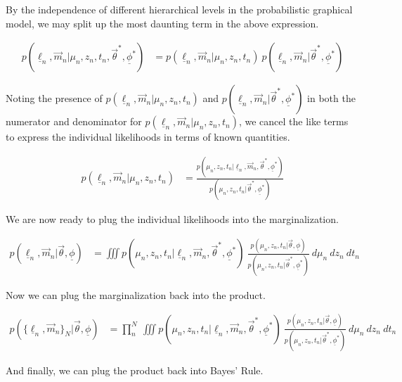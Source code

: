 \documentclass[12pt, onecolumn]{emulateapj}
\newcommand{\textul}{\underline}
\begin{document}
By the independence of different hierarchical levels in the probabilistic graphical model, we may split up the most daunting term in the above expression.

\begin{align}
p(\textul{\ell}_{n}, \vec{m}_{n} | \mu_{n}, z_{n}, t_{n}, \vec{\theta}^{*}, \textul{\phi}^{*}) &= p(\textul{\ell}_{n}, \vec{m}_{n} | \mu_{n}, z_{n}, t_{n})\ p(\textul{\ell}_{n}, \vec{m}_{n} | \vec{\theta}^{*}, \textul{\phi}^{*})
\end{align}

Noting the presence of $p(\textul{\ell}_{n}, \vec{m}_{n} | \mu_{n}, z_{n}, t_{n})$ and $p(\textul{\ell}_{n}, \vec{m}_{n} | \vec{\theta}^{*}, \textul{\phi}^{*})$ in both the numerator and denominator for $p(\textul{\ell}_{n}, \vec{m}_{n} | \mu_{n}, z_{n}, t_{n})$, we cancel the like terms to express the individual likelihoods in terms of known quantities.

\begin{align}
p(\textul{\ell}_{n}, \vec{m}_{n} | \mu_{n}, z_{n}, t_{n}) &= \frac{p(\mu_{n}, z_{n}, t_{n} | \textul{\ell}_{n}, \vec{m}_{n}, \vec{\theta}^{*}, \textul{\phi}^{*})}{p(\mu_{n}, z_{n}, t_{n} | \vec{\theta}^{*}, \textul{\phi}^{*})}
\end{align}

We are now ready to plug the individual likelihoods into the marginalization.

\begin{align}
p(\textul{\ell}_{n}, \vec{m}_{n} | \vec{\theta}, \textul{\phi}) &= \iiint p(\mu_{n}, z_{n}, t_{n} | \textul{\ell}_{n}, \vec{m}_{n}, \vec{\theta}^{*}, \textul{\phi}^{*})\ \frac{p(\mu_{n}, z_{n}, t_{n} | \vec{\theta}, \textul{\phi})}{p(\mu_{n}, z_{n}, t_{n} | \vec{\theta}^{*}, \textul{\phi}^{*})}\ d\mu_{n}\ dz_{n}\ dt_{n}
\end{align}

Now we can plug the marginalization back into the product.

\begin{align}
p(\{\textul{\ell}_{n}, \vec{m}_{n}\}_{N} | \vec{\theta}, \textul{\phi}) &= \prod_{n}^{N}\ \iiint p(\mu_{n}, z_{n}, t_{n} | \textul{\ell}_{n}, \vec{m}_{n}, \vec{\theta}^{*}, \textul{\phi}^{*})\ \frac{p(\mu_{n}, z_{n}, t_{n} | \vec{\theta}, \textul{\phi})}{p(\mu_{n}, z_{n}, t_{n} | \vec{\theta}^{*}, \textul{\phi}^{*})}\ d\mu_{n}\ dz_{n}\ dt_{n}
\end{align}

And finally, we can plug the product back into Bayes' Rule.
\end{document}
